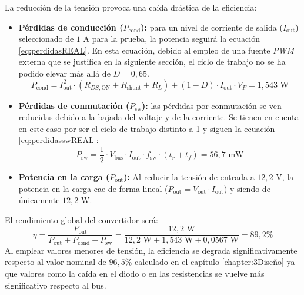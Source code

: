 \documentclass[12pt]{report} %
\begin{document}
La reducción de la tensión provoca una caída drástica de la eficiencia:
\begin{itemize}
    \item \textbf{Pérdidas de conducción ($P_{\text{cond}}$):} para un nivel de corriente de salida ($I_{\text{out}}$) seleccionado de $1 \text{ A}$ para la prueba, la potencia seguirá la ecuación \ref{eq:perdidasREAL}. En esta ecuación, debido al empleo de una fuente \textit{PWM} externa que se justifica en la siguiente sección, el ciclo de trabajo no se ha podido elevar más allá de $D = 0{,}65$.
    \begin{equation}
        \label{eq:perdidasREAL}
        P_{\text{cond}} = I_{\text{out}}^2 \cdot (R_{DS,\text{ON}} + R_{\text{shunt}} + R_L) + (1-D) \cdot I_{\text{out}} \cdot V_F = 1{,}543\text{ W}
    \end{equation}
    \item \textbf{Pérdidas de conmutación ($P_{\text{sw}}$):} las pérdidas por conmutación se ven reducidas debido a la bajada del voltaje y de la corriente. Se tienen en cuenta en este caso por ser el ciclo de trabajo distinto a 1 y siguen la ecuación \ref{eq:perdidasswREAL}: 
    \begin{equation}
        \label{eq:perdidasswREAL}
        P_{\text{sw}} = \frac{1}{2} \cdot V_{\text{bus}} \cdot I_{\text{out}} \cdot f_{\text{sw}} \cdot (t_r + t_f) = 56{,}7\text{ mW}
    \end{equation}
    \item \textbf{Potencia en la carga ($P_{\text{out}}$):} Al reducir la tensión de entrada a $12{,}2\text{ V}$, la potencia en la carga cae de forma lineal ($P_{\text{out}} = V_{\text{out}} \cdot I_{\text{out}}$) y siendo de únicamente $12{,}2\text{ W}$.
\end{itemize}

El rendimiento global del convertidor será:
\begin{equation}
    \eta = \frac{P_{\text{out}}}{P_{\text{out}} + P_{\text{cond}} + P_{\text{sw}}} = \frac{12{,}2\text{ W}}{12{,}2\text{ W} + 1{,}543\text{ W} + 0{,}0567\text{ W}} = 89{,}2\%
\end{equation}
Al emplear valores menores de tensión, la eficiencia se degrada significativamente respecto al valor nominal de $96{,}5\%$ calculado en el capítulo \ref{chapter:3Diseño} ya que valores como la caída en el diodo o en las resistencias se vuelve más significativo respecto al bus.
\end{document}
